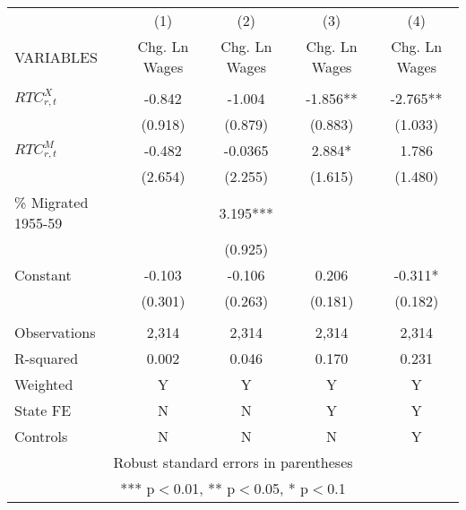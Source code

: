 \begin{tabular}{lcccc} \hline
 & (1) & (2) & (3) & (4) \\
VARIABLES & Chg. Ln Wages & Chg. Ln Wages & Chg. Ln Wages & Chg. Ln Wages \\ \hline
 &  &  &  &  \\
$ RTC_{r,t}^X$ & -0.842 & -1.004 & -1.856** & -2.765** \\
 & (0.918) & (0.879) & (0.883) & (1.033) \\
$ RTC_{r,t}^M$ & -0.482 & -0.0365 & 2.884* & 1.786 \\
 & (2.654) & (2.255) & (1.615) & (1.480) \\
\% Migrated 1955-59 &  & 3.195*** &  &  \\
 &  & (0.925) &  &  \\
Constant & -0.103 & -0.106 & 0.206 & -0.311* \\
 & (0.301) & (0.263) & (0.181) & (0.182) \\
 &  &  &  &  \\
Observations & 2,314 & 2,314 & 2,314 & 2,314 \\
R-squared & 0.002 & 0.046 & 0.170 & 0.231 \\
Weighted & Y & Y & Y & Y \\
State FE & N & N & Y & Y \\
 Controls & N & N & N & Y \\ \hline
\multicolumn{5}{c}{ Robust standard errors in parentheses} \\
\multicolumn{5}{c}{ *** p$<$0.01, ** p$<$0.05, * p$<$0.1} \\
\end{tabular}
